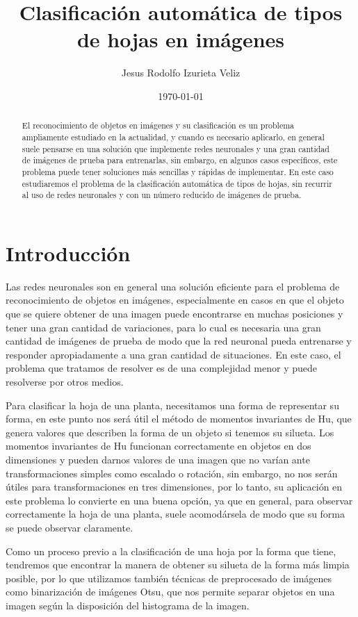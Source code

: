 \documentclass[letter]{article}
\author{Jesus Rodolfo Izurieta Veliz}
\date{\today}
\title{Clasificación automática de tipos de hojas en imágenes}
\begin{document}
\maketitle
\begin{abstract}
El reconocimiento de objetos en imágenes y su clasificación es un problema
ampliamente estudiado en la actualidad, y cuando es necesario aplicarlo, en
general suele pensarse en una solución que implemente redes neuronales y una
gran cantidad de imágenes de prueba para entrenarlas, sin embargo, en algunos
casos específicos, este problema puede tener soluciones más sencillas y rápidas
de implementar. En este caso estudiaremos el problema de la clasificación
automática de tipos de hojas, sin recurrir al uso de redes neuronales y con un
número reducido de imágenes de prueba.
\end{abstract}

\section{Introducción}
\label{sec:orgfcda02d}
Las redes neuronales son en general una solución eficiente para el problema de
reconocimiento de objetos en imágenes, especialmente en casos en que el objeto
que se quiere obtener de una imagen puede encontrarse en muchas posiciones y
tener una gran cantidad de variaciones, para lo cual es necesaria una gran
cantidad de imágenes de prueba de modo que la red neuronal pueda entrenarse y
responder apropiadamente a una gran cantidad de situaciones. En este caso, el
problema que tratamos de resolver es de una complejidad menor y puede resolverse
por otros medios.

Para clasificar la hoja de una planta, necesitamos una forma de representar su
forma, en este punto nos será útil el método de momentos invariantes de Hu, que
genera valores que describen la forma de un objeto si tenemos su silueta. Los
momentos invariantes de Hu funcionan correctamente en objetos en dos dimensiones
y pueden darnos valores de una imagen que no varían ante transformaciones
simples como escalado o rotación, sin embargo, no nos serán útiles para
transformaciones en tres dimensiones, por lo tanto, su aplicación en este
problema lo convierte en una buena opción, ya que en general, para observar
correctamente la hoja de una planta, suele acomodársela de modo que su forma se
puede observar claramente.

Como un proceso previo a la clasificación de una hoja por la forma que tiene,
tendremos que encontrar la manera de obtener su silueta de la forma más limpia
posible, por lo que utilizamos también técnicas de preprocesado de imágenes como
binarización de imágenes Otsu, que nos permite separar objetos en una imagen
según la disposición del histograma de la imagen.
\end{document}
